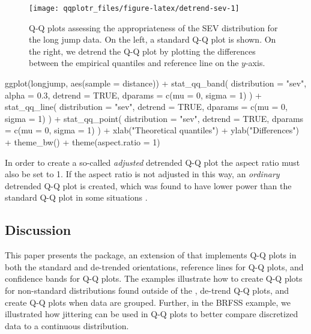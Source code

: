 \begin{Schunk}
\begin{figure}

{\centering \texttt{[image: qqplotr\_files/figure-latex/detrend-sev-1]} 

}

\caption[Q-Q plots assessing the appropriateness of the SEV distribution for the long jump data]{Q-Q plots assessing the appropriateness of the SEV distribution for the long jump data. On the left, a standard Q-Q plot is shown. On the right, we detrend the Q-Q plot by plotting the differences between the empirical quantiles and reference line on the $y$-axis.}\label{fig:detrend-sev}
\end{figure}
\end{Schunk}

\begin{Schunk}
\begin{Sinput}
ggplot(longjump, aes(sample = distance)) +
  stat_qq_band(
  distribution = "sev",
  alpha = 0.3,
  detrend = TRUE,
  dparams = c(mu = 0, sigma = 1)
  ) +
  stat_qq_line(
  distribution = "sev",
  detrend = TRUE,
  dparams = c(mu = 0, sigma = 1)
  ) +
  stat_qq_point(
  distribution = "sev",
  detrend = TRUE,
  dparams = c(mu = 0, sigma = 1)
  ) +
  xlab("Theoretical quantiles") +
  ylab("Differences") +
  theme_bw() +
  theme(aspect.ratio = 1)
\end{Sinput}
\end{Schunk}

In order to create a so-called \emph{adjusted} detrended Q-Q plot
\citep{Loy2016-fg} the aspect ratio must also be set to 1. If the aspect
ratio is not adjusted in this way, an \emph{ordinary} detrended Q-Q plot
is created, which was found to have lower power than the standard Q-Q
plot in some situations \citep{Loy2016-fg}.

\subsection{Discussion}\label{discussion}

This paper presents the  package, an extension of
 that implements Q-Q plots in both the standard and
de-trended orientations, reference lines for Q-Q plots, and confidence
bands for Q-Q plots. The examples illustrate how to create Q-Q plots for
non-standard distributions found outside of the , de-trend
Q-Q plots, and create Q-Q plots when data are grouped. Further, in the
BRFSS example, we illustrated how jittering can be used in Q-Q plots to
better compare discretized data to a continuous distribution.

